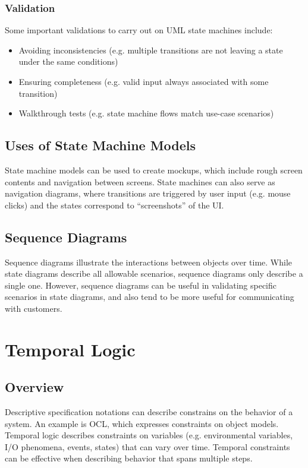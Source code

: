 \documentclass[12pt,titlepage]{article}
\let\stdsection\section
\renewcommand\section{\clearpage\stdsection}
\begin{document}
      \subsubsection{Validation}
        Some important validations to carry out on UML state machines include:
        \begin{itemize}
          \item Avoiding inconsistencies (e.g. multiple transitions are not leaving a state under the same conditions)
          \item Ensuring completeness (e.g. valid input always associated with some transition)
          \item Walkthrough tests (e.g. state machine flows match use-case scenarios)
        \end{itemize}

    \subsection{Uses of State Machine Models}
      State machine models can be used to create mockups, which include rough screen contents and navigation between screens. State machines can also
      serve as navigation diagrams, where transitions are triggered by user input (e.g. mouse clicks) and the states correspond to ``screenshots'' of
      the UI.

    \subsection{Sequence Diagrams}
      Sequence diagrams illustrate the interactions between objects over time. While state diagrams describe all allowable scenarios, sequence diagrams
      only describe a single one. However, sequence diagrams can be useful in validating specific scenarios in state diagrams, and also tend to be more
      useful for communicating with customers.

  \section{Temporal Logic}

    \subsection{Overview}
      Descriptive specification notations can describe constrains on the behavior of a system. An example is OCL, which expresses constraints on object models.
      Temporal logic describes constraints on variables (e.g. environmental variables, I/O phenomena, events, states) that can vary over time. Temporal
      constraints can be effective when describing behavior that spans multiple steps.
\end{document}
